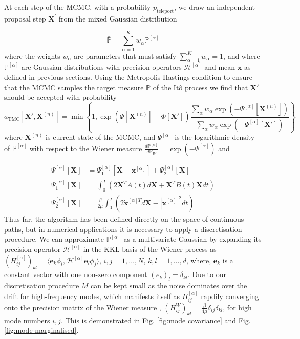 At each step of the MCMC, with a probability $p_{\text{teleport}}$,
we draw an independent proposal step $\mathbf{X}^{'}$ from the mixed
Gaussian distribution

\begin{equation}
\bar{\mathbb{P}}=\sum_{\alpha=1}^{K}w_{\alpha}\mathbb{\mathbb{P}}^{[\alpha]}\label{eq:mixed gaussian-1}
\end{equation}
where the weights $w_{\alpha}$ are parameters that must satisfy $\sum_{\alpha=1}^{K}w_{\alpha}=1$,
and where $\mathbb{\mathbb{P}}^{[\alpha]}$ are Gaussian distributions
with precision operators $\mathcal{H}^{[\alpha]}$ and mean $\bar{\mathbf{x}}$
as defined in previous sections. Using the Metropolis-Hastings condition
to ensure that the MCMC samples the target measure $\mathbb{P}$ of
the Itô process we find that $\mathbf{X}'$ should be accepted with
probability
\begin{equation}
a_{\text{TMC}}\left[\mathbf{X}',\mathbf{X}^{(n)}\right]=\min\left\{ 1,\exp\left(\Phi[\mathbf{X}^{(n)}]-\Phi[\mathbf{X}']\right)\frac{\sum_{\alpha}w_{\alpha}\exp\left(-\Psi^{[\alpha]}[\mathbf{X}^{(n)}]\right)}{\sum_{\alpha}w_{\alpha}\exp\left(-\Psi^{[\alpha]}[\mathbf{X}']\right)}\right\} \label{eq:acceptance probability}
\end{equation}
where $\mathbf{X}^{(n)}$ is current state of the MCMC, and $\Psi^{[\alpha]}$
is the logarithmic density of $\mathbb{P}^{[\alpha]}$ with respect
to the Wiener measure $\frac{d\mathbb{\mathbb{P}}^{[\alpha]}}{d\mathbb{P}_{W}}=\exp(-\Psi^{[\alpha]})$
and

\begin{align}
\Psi^{[\alpha]}[\mathbf{X}] & =\Psi_{1}^{[\alpha]}[\mathbf{X}-\mathbf{x}^{[\alpha]}]+\Psi_{2}^{[\alpha]}[\mathbf{X}]\\
\Psi_{1}^{[\alpha]}[\mathbf{X}] & =\int_{0}^{T}\left(2\mathbf{X}^{T}A(t)d\mathbf{X}+\mathbf{X}^{T}B(t)\mathbf{X}dt\right)\\
\Psi_{2}^{[\alpha]}[\mathbf{X}] & =\frac{\beta}{2\mu}\int_{0}^{T}\left(2\dot{\mathbf{x}}^{[\alpha]T}d\mathbf{X}-|\dot{\mathbf{x}}^{[\alpha]}|^{2}dt\right)
\end{align}
Thus far, the algorithm has been defined directly on the space of
continuous paths, but in numerical applications it is necessary to
apply a discretisation procedure. We can approximate $\mathbb{\mathbb{P}}^{[\alpha]}$
as a multivariate Gaussian by expanding its precision operator $\mathcal{H}^{[\alpha]}$
in the KKL basis \citep{kosambiParallelismPathspaces2016,karhunenUberLineareMethoden1947,loeveProbabilityTheory1977}
of the Wiener process as $\left(H_{ij}^{[\alpha]}\right)_{kl}=\langle\mathbf{e}_{k}\phi_{i},$$\mathcal{H}^{[\alpha]}\mathbf{e}_{l}\phi_{j}\rangle$,
$i,j=1,\dots,N$, $k,l=1,\dots,d$, where, $\mathbf{e}_{k}$ is a
constant vector with one non-zero component $(e_{k})_{l}=\delta_{kl}$.
Due to our discretisation procedure $M$ can be kept small as the
noise dominates over the drift for high-frequency modes, which manifests
itself as $H_{ij}^{[\alpha]}$ rapdily converging onto the precision
matrix of the Wiener measure , $\left(H_{ij}^{W}\right)_{kl}=\frac{\beta}{4\mu}\delta_{ij}\delta_{kl}$,
for high mode numbers $i,j$. This is demonstrated in Fig. \ref{fig:mode covariance}
and Fig. \ref{fig:mode marginalised}.

